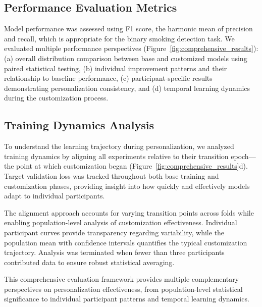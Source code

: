 \documentclass[11pt]{article}
\begin{document}
\subsection{Performance Evaluation Metrics}

Model performance was assessed using F1 score, the harmonic mean of precision and recall, which is appropriate for the binary smoking detection task. We evaluated multiple performance perspectives (Figure~\ref{fig:comprehensive_results}): (a) overall distribution comparison between base and customized models using paired statistical testing, (b) individual improvement patterns and their relationship to baseline performance, (c) participant-specific results demonstrating personalization consistency, and (d) temporal learning dynamics during the customization process.

\subsection{Training Dynamics Analysis}

To understand the learning trajectory during personalization, we analyzed training dynamics by aligning all experiments relative to their transition epoch—the point at which customization began (Figure~\ref{fig:comprehensive_results}d). Target validation loss was tracked throughout both base training and customization phases, providing insight into how quickly and effectively models adapt to individual participants.

The alignment approach accounts for varying transition points across folds while enabling population-level analysis of customization effectiveness. Individual participant curves provide transparency regarding variability, while the population mean with confidence intervals quantifies the typical customization trajectory. Analysis was terminated when fewer than three participants contributed data to ensure robust statistical averaging.

This comprehensive evaluation framework provides multiple complementary perspectives on personalization effectiveness, from population-level statistical significance to individual participant patterns and temporal learning dynamics.
\end{document}
